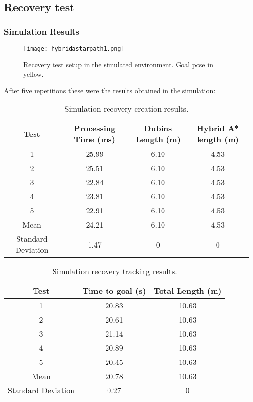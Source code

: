 \clearpage

\subsection{Recovery test}
\label{subsec:recovery_test}

\subsubsection{Simulation Results}

\begin{figure}[h]
    \centering
    \texttt{[image: hybridastarpath1.png]}
    \caption{Recovery test setup in the simulated environment. Goal pose in yellow.}
    \label{fig:recovery_test}
\end{figure}
After five repetitions these were the results obtained in the simulation:

\begin{table}[H]
    \centering
    \caption{Simulation recovery creation results.}
    \begin{tabular}{|c|c|c|c|}
        \hline
        \textbf{Test} & \textbf{Processing Time (ms)} & \textbf{Dubins Length (m)} & \textbf{Hybrid A* length (m)} \\
        \hline
         1 & 25.99 & 6.10 & 4.53 \\
        \hline
         2 & 25.51 & 6.10 & 4.53 \\
         \hline
         3 & 22.84 & 6.10 & 4.53 \\
         \hline
         4 & 23.81 & 6.10 & 4.53 \\
         \hline
         5 & 22.91 & 6.10 & 4.53 \\
         \hline
        Mean & 24.21 & 6.10 & 4.53 \\
        \hline
        Standard Deviation & 1.47 & 0 & 0 \\
        \hline
    \end{tabular}
    \label{tab:recovery_path_results1}
\end{table}
\begin{table}[H]
    \centering
    \caption{Simulation recovery tracking results.}
    \begin{tabular}{|c|c|c|}
        \hline
        \textbf{Test} & \textbf{Time to goal (s)} & \textbf{Total Length (m)} \\
         \hline
         1 & 20.83 & 10.63 \\
         \hline
         2 & 20.61 & 10.63 \\
         \hline
         3 & 21.14 & 10.63 \\
         \hline
         4 & 20.89 & 10.63 \\
         \hline
         5 & 20.45 & 10.63 \\
         \hline
        Mean & 20.78 & 10.63 \\
        \hline
        Standard Deviation & 0.27 & 0 \\
        \hline
    \end{tabular}
    \label{tab:recovery_path_results2}
\end{table}

